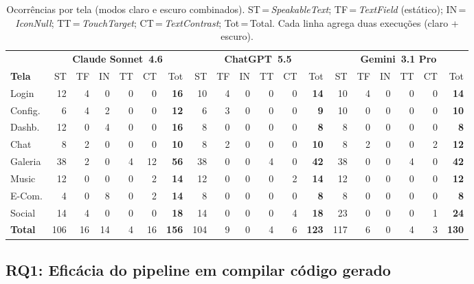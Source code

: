 \documentclass[sigconf,review]{webmedia}
\begin{document}
\begin{table}[t]
\centering
\caption{Ocorrências por tela (modos claro e escuro combinados).
  ST\,=\,\textit{SpeakableText}; TF\,=\,\textit{TextField} (estático);
  IN\,=\,\textit{IconNull}; TT\,=\,\textit{TouchTarget};
  CT\,=\,\textit{TextContrast}; Tot\,=\,Total.
  Cada linha agrega duas execuções (claro + escuro).}
\label{tab:results}
\setlength{\tabcolsep}{3pt}
{\tiny
\begin{tabular}{l rrrrrr rrrrrr rrrrrr}
\toprule
& \multicolumn{6}{c}{\textbf{Claude Sonnet~4.6}}
& \multicolumn{6}{c}{\textbf{ChatGPT~5.5}}
& \multicolumn{6}{c}{\textbf{Gemini~3.1 Pro}} \\
\cmidrule(lr){2-7}\cmidrule(lr){8-13}\cmidrule(lr){14-19}
\textbf{Tela}
  & ST & TF & IN & TT & CT & Tot
  & ST & TF & IN & TT & CT & Tot
  & ST & TF & IN & TT & CT & Tot \\
\midrule
Login    & 12 &  4 &  0 & 0 &  0 & \textbf{16} & 10 &  4 & 0 & 0 & 0 & \textbf{14} & 10 &  4 & 0 & 0 & 0 & \textbf{14} \\
Config.  &  6 &  4 &  2 & 0 &  0 & \textbf{12} &  6 &  3 & 0 & 0 & 0 & \textbf{ 9} & 10 &  0 & 0 & 0 & 0 & \textbf{10} \\
Dashb.   & 12 &  0 &  4 & 0 &  0 & \textbf{16} &  8 &  0 & 0 & 0 & 0 & \textbf{ 8} &  8 &  0 & 0 & 0 & 0 & \textbf{ 8} \\
Chat     &  8 &  2 &  0 & 0 &  0 & \textbf{10} &  8 &  2 & 0 & 0 & 0 & \textbf{10} &  8 &  2 & 0 & 0 & 2 & \textbf{12} \\
Galeria  & 38 &  2 &  0 & 4 & 12 & \textbf{56} & 38 &  0 & 0 & 4 & 0 & \textbf{42} & 38 &  0 & 0 & 4 & 0 & \textbf{42} \\
Music    & 12 &  0 &  0 & 0 &  2 & \textbf{14} & 12 &  0 & 0 & 0 & 2 & \textbf{14} & 12 &  0 & 0 & 0 & 0 & \textbf{12} \\
E-Com.   &  4 &  0 &  8 & 0 &  2 & \textbf{14} &  8 &  0 & 0 & 0 & 0 & \textbf{ 8} &  8 &  0 & 0 & 0 & 0 & \textbf{ 8} \\
Social   & 14 &  4 &  0 & 0 &  0 & \textbf{18} & 14 &  0 & 0 & 0 & 4 & \textbf{18} & 23 &  0 & 0 & 0 & 1 & \textbf{24} \\
\midrule
\textbf{Total}
  & 106 & 16 & 14 & 4 & 16 & \textbf{156}
  & 104 &  9 &  0 & 4 &  6 & \textbf{123}
  & 117 &  6 &  0 & 4 &  3 & \textbf{130} \\
\bottomrule
\end{tabular}
}
\end{table}


\subsection{RQ1: Eficácia do pipeline em compilar código gerado}
\end{document}
